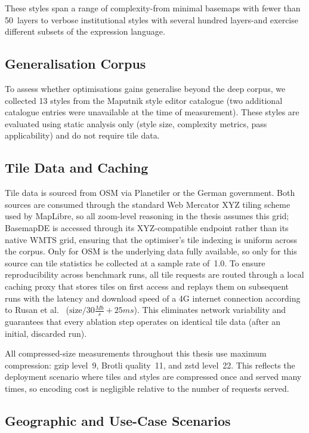 These styles span a range of complexity-from minimal basemaps with fewer than 50~layers to verbose institutional styles with several hundred layers-and exercise different subsets of the expression language.

\subsection{Generalisation Corpus}\label{sub_generalisation_corpus}

To assess whether optimisations gains generalise beyond the deep corpus, we collected 13 styles from the Maputnik style editor catalogue (two additional catalogue entries were unavailable at the time of measurement).
These styles are evaluated using static analysis only (style size, complexity metrics, pass applicability) and do not require tile data.

\subsection{Tile Data and Caching}\label{sub_tile_data}

Tile data is sourced from \ac{OSM} via Planetiler or the German government.
Both sources are consumed through the standard Web Mercator XYZ tiling scheme used by MapLibre, so all zoom-level reasoning in the thesis assumes this grid; BasemapDE is accessed through its XYZ-compatible endpoint rather than its native \acs{WMTS} grid, ensuring that the optimiser's tile indexing is uniform across the corpus.
Only for \ac{OSM} is the underlying data fully available, so only for this source can tile statistics be collected at a sample rate of~1.0.
To ensure reproducibility across benchmark runs, all tile requests are routed through a local caching proxy that stores tiles on first access and replays them on subsequent runs with the latency and download speed of a 4G internet connection according to Rusan et al.~\cite{rusanAssessmentPacketLatency2015} ($\text{size} / 30\frac{Mb}{s} + 25ms$).
This eliminates network variability and guarantees that every ablation step operates on identical tile data (after an initial, discarded run).

All compressed-size measurements throughout this thesis use maximum compression: gzip level~9, Brotli quality~11, and zstd level~22.
This reflects the deployment scenario where tiles and styles are compressed once and served many times, so encoding cost is negligible relative to the number of requests served.

\subsection{Geographic and Use-Case Scenarios}\label{sub_scenarios}

